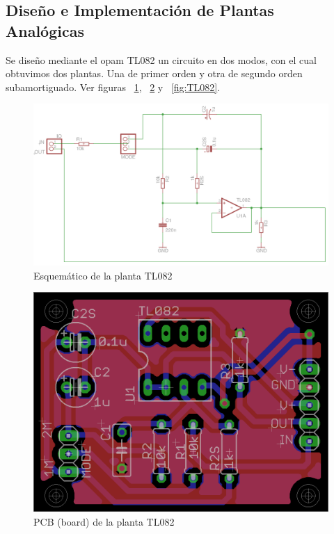 \clearpage

\subsection{Diseño e Implementación de Plantas Analógicas}

Se diseño mediante el opam TL082 un circuito en dos modos, con el cual obtuvimos dos plantas. Una de primer orden y otra de segundo orden subamortiguado. Ver figuras ~\ref{fig:schematic-planta-TL082}, ~\ref{fig:board-planta-TL082} y ~\ref{fig:TL082}.

\begin{figure}[h!]
  \centering
  \includegraphics[scale=0.25]{images/activities/plantas_analogicas/schematic-planta-TL082.png}
  \caption{Esquemático de la planta TL082}
  \label{fig:schematic-planta-TL082}
\end{figure}

\begin{figure}[h!]
  \centering
  \includegraphics[scale=0.25]{images/activities/plantas_analogicas/board-planta-TL082.png}
  \caption{PCB (board) de la planta TL082}
  \label{fig:board-planta-TL082}
\end{figure}

